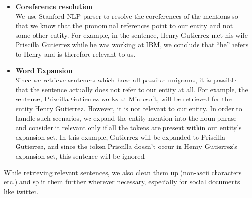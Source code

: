 \begin{itemize}
\item \textbf{Coreference resolution} \\
We use Stanford NLP parser to resolve the coreferences of the mentions so that we know that the pronominal references point to our entity and not some other entity. For example, in the sentence, Henry Gutierrez met his wife Priscilla Gutierrez while he was working at IBM, we conclude that “he” refers to Henry and is therefore relevant to us.
\item \textbf{Word Expansion} \\
Since we retrieve sentences which have all possible unigrams, it is possible that the sentence actually does not refer to our entity at all. For example, the sentence, Priscilla Gutierrez works at Microsoft, will be retrieved for the entity Henry Gutierrez. However, it is not relevant to our entity. In order to handle such scenarios, we expand the entity mention into the noun phrase and consider it relevant only if all the tokens are present within our entity’s expansion set. In this example, Gutierrez will be expanded to Priscilla Gutierrez, and since the token Priscilla doesn’t occur in Henry Gutierrez’s expansion set, this sentence will be ignored.
\end{itemize}
While retrieving relevant sentences, we also clean them up (non-ascii characters etc.) and split them further wherever necessary, especially for social documents like twitter.
